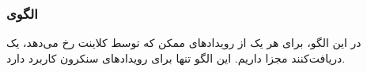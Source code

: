 \subsubsection{الگوی }
\label{smMultipleEvRecSec}
\begin{RTL}
در این الگو، برای هر یک از رویدادهای ممکن که توسط کلاینت رخ می‌دهد، یک
دریافت‌کنند مجزا داریم. این الگو تنها برای رویدادهای سنکرون کاربرد دارد.
\end{RTL}
